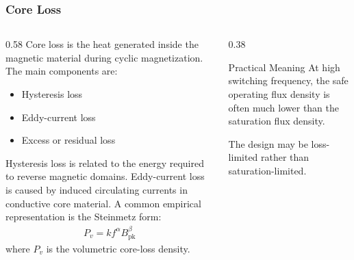 \begin{frame}
    \frametitle{Core Loss}

    \begin{columns}
        \begin{column}{0.58\textwidth}
            Core loss is the heat generated inside the magnetic material during cyclic magnetization. The main components are:
            \begin{itemize}
                \item Hysteresis loss
                \item Eddy-current loss
                \item Excess or residual loss
            \end{itemize}
            Hysteresis loss is related to the energy required to reverse magnetic domains. Eddy-current loss is caused by induced circulating currents in conductive core material. A common empirical representation is the Steinmetz form:
            \begin{align}
                P_v = k f^{\alpha} B_{\mathrm{pk}}^{\beta}
            \end{align}
            where $P_v$ is the volumetric core-loss density.
        \end{column}

        \begin{column}{0.38\textwidth}
            \begin{block}{Practical Meaning}
                At high switching frequency, the safe operating flux density is often much lower than the saturation flux density.

                \vspace{0.15cm}

                The design may be loss-limited rather than saturation-limited.
            \end{block}
        \end{column}
    \end{columns}
\end{frame}


